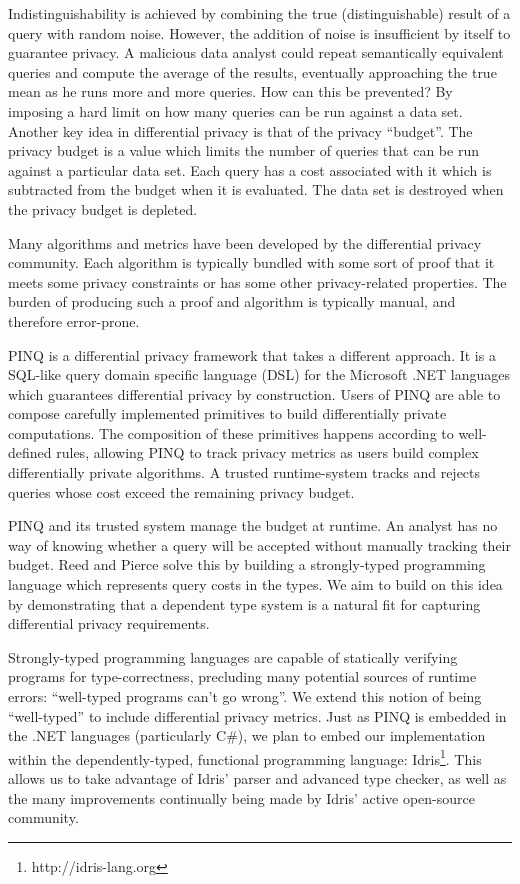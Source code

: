 \documentclass[12pt]{article}
\begin{document}
Indistinguishability is achieved by combining the true (distinguishable) result of a query with random noise.
However, the addition of noise is insufficient by itself to guarantee privacy.
A malicious data analyst could repeat semantically equivalent queries and compute the average of the results, eventually approaching the true mean as he runs more and more queries.
How can this be prevented?
By imposing a hard limit on how many queries can be run against a data set.
Another key idea in differential privacy is that of the privacy ``budget''.
The privacy budget is a value which limits the number of queries that can be run against a particular data set.
Each query has a cost associated with it which is subtracted from the budget when it is evaluated.
The data set is destroyed when the privacy budget is depleted.

Many algorithms and metrics have been developed by the differential privacy community.
Each algorithm is typically bundled with some sort of proof that it meets some privacy constraints or has some other privacy-related properties.
The burden of producing such a proof and algorithm is typically manual, and therefore error-prone.

PINQ\cite{conf/sigmod/McSherry09} is a differential privacy framework that takes a different approach.
It is a SQL-like query domain specific language (DSL) for the Microsoft .NET languages which guarantees differential privacy by construction.
Users of PINQ are able to compose carefully implemented primitives to build differentially private computations.
The composition of these primitives happens according to well-defined rules, allowing PINQ to track privacy metrics as users build complex differentially private algorithms.
A trusted runtime-system tracks and rejects queries whose cost exceed the remaining privacy budget.

PINQ and its trusted system manage the budget at runtime.
An analyst has no way of knowing whether a query will be accepted without manually tracking their budget.
Reed and Pierce\cite{conf/icfp/ReedP10} solve this by building a strongly-typed programming language which represents query costs in the types.
We aim to build on this idea by demonstrating that a dependent type system is a natural fit for capturing differential privacy requirements.

Strongly-typed programming languages are capable of statically verifying programs for type-correctness, precluding many potential sources of runtime errors: ``well-typed programs can't go wrong''.
We extend this notion of being ``well-typed'' to include differential privacy metrics.
Just as PINQ is embedded in the .NET languages (particularly C\#), we plan to embed our implementation within the dependently-typed, functional programming language: Idris\footnote{http://idris-lang.org}.
This allows us to take advantage of Idris' parser and advanced type checker, as well as the many improvements continually being made by Idris' active open-source community.
\end{document}
